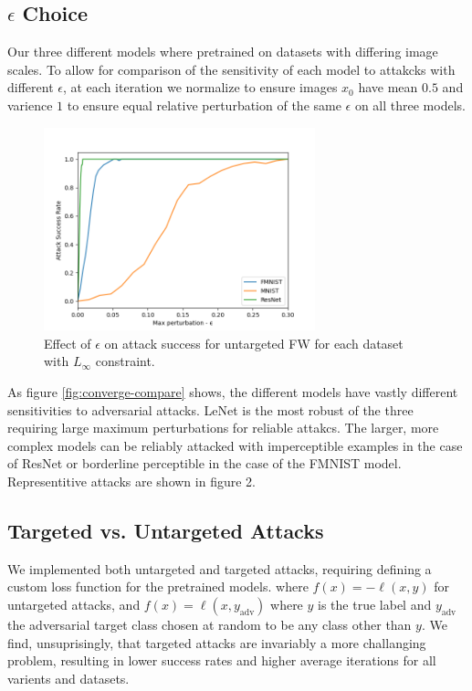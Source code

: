 \documentclass{article}
\begin{document}
\subsection{$\epsilon$ Choice}
Our three different models where pretrained on datasets with differing image scales. To allow for comparison of the sensitivity of each model to attakcks with different $\epsilon$, at each iteration we normalize to ensure images $x_0$ have mean $0.5$ and varience $1$ to ensure equal relative perturbation of the same $\epsilon$ on all three models. 

\begin{figure}[H]
    \centering
    \includegraphics[width=0.7\textwidth]{plots/eps_choice.png}
    \caption{Effect of $\epsilon$ on attack success for untargeted FW for each dataset with $L_\infty$ constraint.}
    \label{fig:eps}
\end{figure}

As figure \ref{fig:converge-compare} shows, the different models have vastly different sensitivities to adversarial attacks. LeNet is the most robust of the three requiring large maximum perturbations for reliable attakcs. The larger, more complex models can be reliably attacked with imperceptible examples in the case of ResNet or borderline perceptible in the case of the FMNIST model. Representitive attacks are shown in figure 2.

\subsection{Targeted vs. Untargeted Attacks}
We implemented both untargeted and targeted attacks, requiring defining a custom loss function for the pretrained models. where $f(x) = -\ell(x, y)$ for untargeted attacks, and $f(x) = \ell(x, y_\text{adv})$ where $y$ is the true label and $y_\text{adv}$ the adversarial target class chosen at random to be any class other than $y$. We find, unsuprisingly, that targeted attacks are invariably a more challanging problem, resulting in lower success rates and higher average iterations for all varients and datasets.
\end{document}
